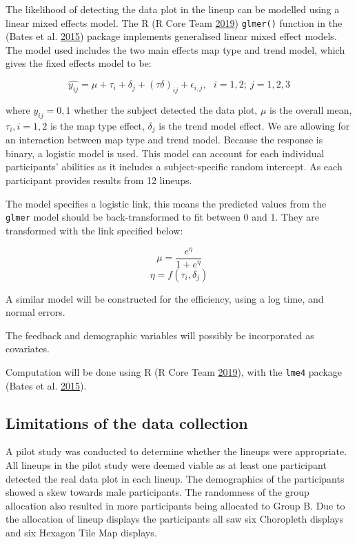 \documentclass[conference,final,]{IEEEtran}
\begin{document}
The likelihood of detecting the data plot in the lineup can be modelled using a linear mixed effects model.
The R (R Core Team \protect\hyperlink{ref-RCore}{2019}) \texttt{glmer()} function in the (Bates et al. \protect\hyperlink{ref-lme4}{2015}) package implements generalised linear mixed effect models. The model used includes the two main effects map type and trend model, which gives the fixed effects model to be:

\[\widehat{y_{ij}} = \mu + \tau_i + \delta_j + (\tau\delta)_{ij} + \epsilon_{i,j}, ~~~ i=1,2; ~j=1,2,3\]

where \(y_{ij} = 0, 1\) whether the subject detected the data plot, \(\mu\) is the overall mean, \(\tau_i, i=1,2\) is the map type effect, \(\delta_j\) is the trend model effect. We are allowing for an interaction between map type and trend model. Because the response is binary, a logistic model is used. This model can account for each individual participants' abilities as it includes a subject-specific random intercept. As each participant provides results from 12 lineups.

The model specifies a logistic link, this means the predicted values from the \texttt{glmer} model should be back-transformed to fit between 0 and 1. They are transformed with the link specified below:

\[\mu = \frac{e^{\eta}}{1 + e^{\eta}}\]
\[\eta = f(\tau_i,\delta_j)\]

A similar model will be constructed for the efficiency, using a log time, and normal errors.

The feedback and demographic variables will possibly be incorporated as covariates.

Computation will be done using R (R Core Team \protect\hyperlink{ref-RCore}{2019}), with the \texttt{lme4} package (Bates et al. \protect\hyperlink{ref-lme4}{2015}).

\hypertarget{limitations-of-the-data-collection}{%
\subsection{Limitations of the data collection}\label{limitations-of-the-data-collection}}

A pilot study was conducted to determine whether the lineups were appropriate. All lineups in the pilot study were deemed viable as at least one participant detected the real data plot in each lineup.
The demographics of the participants showed a skew towards male participants.
The randomness of the group allocation also resulted in more participants being allocated to Group B. Due to the allocation of lineup displays the participants all saw six Choropleth displays and six Hexagon Tile Map displays.
\end{document}
